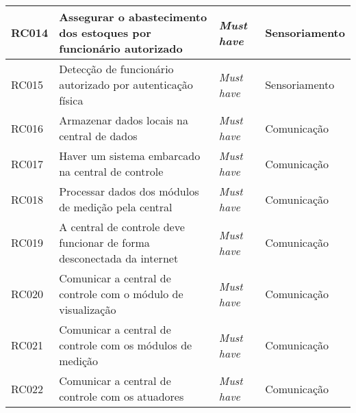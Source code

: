 \begin{table}[H]
\begin{adjustbox}{max width = \textwidth}
\begin{tabular}{|L{1.5cm}|L{8.5cm}|C{2.5cm}|C{3.5cm}|}
        RC014 & Assegurar o abastecimento dos estoques por funcionário autorizado & \textit{Must have} & Sensoriamento\\ \hline
        RC015 & Detecção de funcionário autorizado por autenticação física & \textit{Must have} & Sensoriamento \\ \hline
        RC016 & Armazenar dados locais na central de dados & \textit{Must have} & Comunicação\\ \hline
        RC017 & Haver um sistema embarcado na central de controle & \textit{Must have} & Comunicação\\ \hline
        RC018 & Processar dados dos módulos de medição  pela central & \textit{Must have} & Comunicação\\ \hline
        RC019 & A central de controle deve funcionar de forma desconectada da internet & \textit{Must have} & Comunicação\\ \hline
        RC020 & Comunicar a central de controle  com o módulo de visualização & \textit{Must have} & Comunicação\\ \hline
        RC021 & Comunicar a central de controle com os módulos de medição & \textit{Must have} & Comunicação\\ \hline
        RC022 & Comunicar a central de controle com os atuadores & \textit{Must have} & Comunicação\\ \hline
        \end{tabular}
	\end{adjustbox}    
    \label{tab:req_eletronica}
\end{table}



